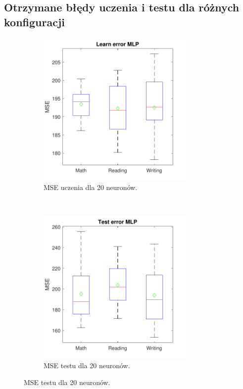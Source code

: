 \documentclass[12pt]{article}
\begin{document}
\subsection{Otrzymane błędy uczenia i testu dla różnych konfiguracji}

\begin{figure}[H]
\centering
\begin{subfigure}[t]{0.48\textwidth} 
\centering
\includegraphics[height=3in]{purelin_purelin_20_learnBoxplot.pdf}
\caption{MSE uczenia dla 20 neuronów.}
\end{subfigure}
~~
\begin{subfigure}[t]{0.48\textwidth} 
\centering
\includegraphics[height=3in]{purelin_purelin_20_testBoxplot.pdf}
\caption{MSE testu dla 20 neuronów.}
\end{subfigure}


\end{figure}
\end{document}
